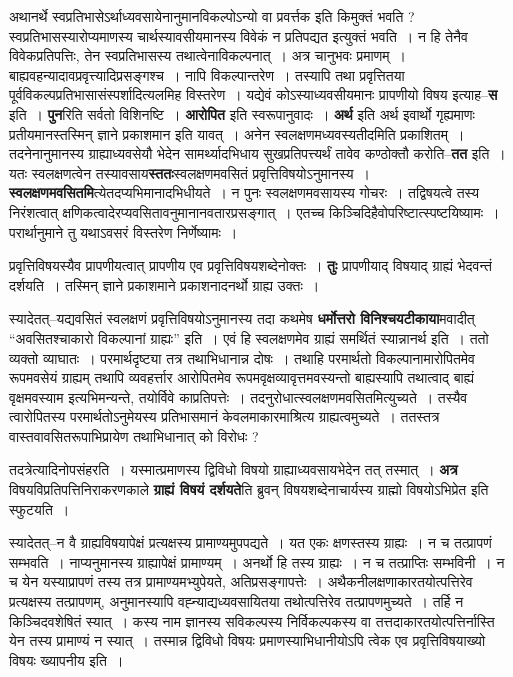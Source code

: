 \documentclass[article,12pt,a4paper]{memoir}
\begin{document}
	  \pstart अथानर्थे स्वप्रतिभासेऽर्थाध्यवसायेनानुमानविकल्पोऽन्यो वा प्रवर्त्तक इति किमुक्तं भवति ? स्वप्रतिभासस्यारोप्यमाणस्य चार्थस्यावसीयमानस्य विवेकं न प्रतिपद्यत इत्युक्तं भवति । न हि तेनैव विवेकप्रतिपत्तिः, तेन स्वप्रतिभासस्य तथात्वेनाविकल्पनात् । अत्र चानुभवः प्रमाणम् । बाह्यवहन्यादावप्रवृत्त्यादिप्रसङ्गश्च । नापि विकल्पान्तरेण । तस्यापि तथा प्रवृत्तितया पूर्वविकल्पप्रतिभासासंस्पर्शादित्यलमिह विस्तरेण । यद्येवं कोऽस्याध्यवसीयमानः प्रापणीयो विषय इत्याह--\textbf{स} इति । \textbf{पुन}रिति सर्वतो विशिनष्टि । \textbf{आरोपित} इति स्वरूपानुवादः । \textbf{अर्थ} इति अर्थ इवार्थो गृह्यमाणः प्रतीयमानस्तस्मिन् ज्ञाने प्रकाशमान इति यावत् । अनेन स्वलक्षणमध्यवस्यतीदमिति प्रकाशितम् । तदनेनानुमानस्य ग्राह्याध्यवसेयौ भेदेन सामर्थ्यादभिधाय सुखप्रतिपत्त्यर्थं तावेव कण्ठोक्तौ करोति--\textbf{तत} इति । यतः स्वलक्षणत्वेन तस्यावसाय\textbf{स्ततः}\leavevmode{}स्वलक्षणमवसितं प्रवृत्तिविषयोऽनुमानस्य । \textbf{स्वलक्षणमवसितमि}त्येतदप्यभिमानादभिधीयते । न पुनः स्वलक्षणमवसायस्य गोचरः । तद्विषयत्वे तस्य निरंशत्वात् क्षणिकत्वादेरप्यवसितावनुमानानवतारप्रसङ्गात् । एतच्च किञ्चिदिहैवोपरिष्टात्स्पष्टयिष्यामः । परार्थानुमाने तु यथाऽवसरं विस्तरेण निर्णेष्यामः ।
	\pend
      

	  \pstart प्रवृत्तिविषयस्यैव प्रापणीयत्वात् प्रापणीय एव प्रवृत्तिविषयशब्देनोक्तः । \textbf{तुः} प्रापणीयाद् विषयाद् ग्राह्यं भेदवन्तं दर्शयति । तस्मिन् ज्ञाने प्रकाशमाने प्रकाशनादनर्थो ग्राह्य उक्तः ।
	\pend
      

	  \pstart स्यादेतत्--यद्यवसितं स्वलक्षणं प्रवृत्तिविषयोऽनुमानस्य तदा कथमेष \textbf{धर्मोत्तरो विनिश्चयटीकाया}मवादीत् “अवसितश्चाकारो विकल्पानां ग्राह्यः” इति । एवं हि स्वलक्षणमेव ग्राह्यं समर्थितं स्यान्नानर्थ इति । ततो व्यक्तो व्याघातः । परमार्थदृष्ट्या तत्र तथाभिधानान्न दोषः । तथाहि परमार्थतो विकल्पानामारोपितमेव रूपमवसेयं ग्राह्यम् तथापि व्यवहर्त्तार आरोपितमेव रूपमवृक्षव्यावृत्तमवस्यन्तो बाह्यस्यापि तथात्वाद् बाह्यं वृक्षमवस्याम इत्यभिमन्यन्ते, तयोर्विवे  \leavevmode{} काप्रतिपत्तेः । तदनुरोधात्स्वलक्षणमवसितमित्युच्यते । तस्यैव त्वारोपितस्य परमार्थतोऽनुमेयस्य प्रतिभासमानं केवलमाकारमाश्रित्य ग्राह्यत्वमुच्यते । ततस्तत्र वास्तवावसितरूपाभिप्रायेण तथाभिधानात् को विरोधः ?
	\pend
      

	  \pstart तदत्रेत्यादिनोपसंहरति । यस्मात्प्रमाणस्य द्विविधो विषयो ग्राह्याध्यवसायभेदेन तत् तस्मात् । \textbf{अत्र} विषयविप्रतिपत्तिनिराकरणकाले \textbf{ग्राह्यं विषयं दर्शयते}ति ब्रुवन् विषयशब्देनाचार्यस्य ग्राह्मो विषयोऽभिप्रेत इति स्फुटयति ।
	\pend
      

	  \pstart स्यादेतत्--न वै ग्राह्यविषयापेक्षं प्रत्यक्षस्य प्रामाण्यमुपपद्यते । यत एकः क्षणस्तस्य ग्राह्यः । न च तत्प्रापणं सम्भवति । नाप्यनुमानस्य ग्राह्यापेक्षं प्रामाण्यम् । अनर्थो हि तस्य ग्राह्यः । न च तत्प्राप्तिः सम्भविनी । न च येन यस्याप्रापणं तस्य तत्र प्रामाण्यमभ्युपेयते, अतिप्रसङ्गापत्तेः । अथैकनीलक्षणाकारतयोत्पत्तिरेव प्रत्यक्षस्य तत्प्रापणम्, अनुमानस्यापि वह्न्याद्यध्यवसायितया तथोत्पत्तिरेव तत्प्रापणमुच्यते । तर्हि न किञ्चिदवशेषितं स्यात् । कस्य नाम ज्ञानस्य सविकल्पस्य निर्विकल्पकस्य वा तत्तदाकारतयोत्पत्तिर्नास्ति येन तस्य प्रामाण्यं न स्यात् । तस्मान्न द्विविधो विषयः प्रमाणस्याभिधानीयोऽपि त्वेक एव प्रवृत्तिविषयाख्यो विषयः ख्यापनीय इति ।
	\pend
      
\end{document}
